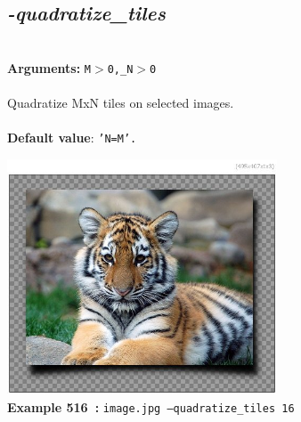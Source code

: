 \documentclass[a4paper,11pt,twoside]{book}
\begin{document}
\subsection{\emph{-quadratize\_tiles} }\vspace*{-0.5em}
~\\\textbf{Arguments: } 
{\small \texttt{M$>$0,\_N$>$0}}\\~\\
Quadratize MxN tiles on selected images.
~\\~\\\textbf{Default value}: {\small \texttt{'N=M'.}}
\begin{center}\includegraphics[keepaspectratio=true,height=7cm,width=\textwidth]{img/gmic_def516.jpg}\\
{\footnotesize \textbf{Example 516~:} \texttt{image.jpg --quadratize\_tiles 16}}
\end{center}
\end{document}
